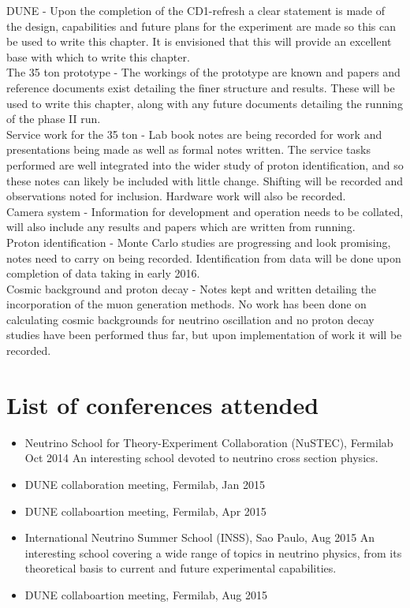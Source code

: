 \documentclass[11pt]{report} %
\begin{document}
{DUNE - Upon the completion of the CD1-refresh a clear statement is made of the design, capabilities and future plans for the experiment are made so this can be used to write this chapter. It is envisioned that this will provide an excellent base with which to write this chapter. \\

The 35 ton prototype - The workings of the prototype are known and papers and reference documents exist detailing the finer structure and results. These will be used to write this chapter, along with any future documents detailing the running of the phase II run. \\

Service work for the 35 ton - Lab book notes are being recorded for work and presentations being made as well as formal notes written. The service tasks performed are well integrated into the wider study of proton identification, and so these notes can likely be included with little change. Shifting will be recorded and observations noted for inclusion. Hardware work will also be recorded. \\

Camera system - Information for development and operation needs to be collated, will also include any results and papers which are written from running. \\

Proton identification - Monte Carlo studies are progressing and look promising, notes need to carry on being recorded. Identification from data will be done upon completion of data taking in early 2016. \\

Cosmic background and proton decay - Notes kept and written detailing the incorporation of the muon generation methods. No work has been done on calculating cosmic backgrounds for neutrino oscillation and no proton decay studies have been performed thus far, but upon implementation of work it will be recorded.

\section{List of conferences attended}
\begin{itemize}

\item Neutrino School for Theory-Experiment Collaboration (NuSTEC), Fermilab Oct 2014
  \subitem An interesting school devoted to neutrino cross section physics.
\item DUNE collaboration meeting, Fermilab, Jan 2015
\item DUNE collaboartion meeting, Fermilab, Apr 2015
\item International Neutrino Summer School (INSS), Sao Paulo, Aug 2015
  \subitem An interesting school covering a wide range of topics in neutrino physics, from its theoretical basis to current and future experimental capabilities. 
\item DUNE collaboartion meeting, Fermilab, Aug 2015


\end{itemize}}
\end{document}
